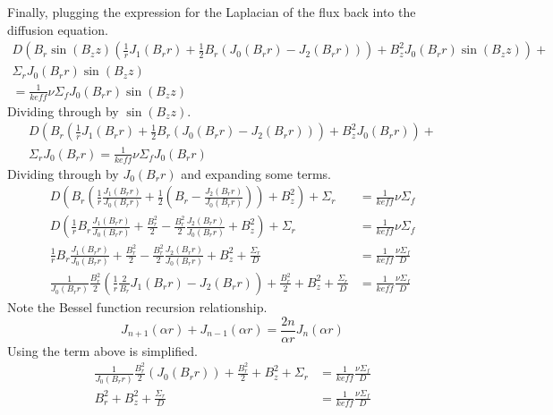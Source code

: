   Finally, plugging the expression for the Laplacian of the flux back into the
  diffusion equation.
  \begin{multline}
    D \left( B_r \sin(B_z z) \left( \frac{1}{r} J_1(B_r r) + \frac{1}{2} B_r
    \left( J_0(B_r r) - J_2(B_r r) \right) \right) + B_z^2 J_0(B_r r) \sin(B_z
    z) \right) + \\
    \Sigma_r J_0(B_r r) \sin(B_z z) \\
    = \frac{1}{keff} \nu
    \Sigma_f J_0(B_r r) \sin(B_z z)
  \end{multline}
  Dividing through by $\sin(B_z z)$.
  \begin{multline}
    D \left( B_r \left( \frac{1}{r} J_1(B_r r) + \frac{1}{2} B_r
    \left( J_0(B_r r) - J_2(B_r r) \right) \right) + B_z^2 J_0(B_r r) \right)+\\
    \Sigma_r J_0(B_r r) = \frac{1}{keff} \nu \Sigma_f J_0(B_r r) 
  \end{multline}
  Dividing through by $J_0(B_r r)$ and expanding some terms.
  \begin{align}
    D \left( B_r \left( \frac{1}{r} \frac{J_1(B_r r)}{J_0(B_r r)} + 
      \frac{1}{2} \left(B_r - \frac{J_2(B_r r)}{J_0(B_r r)} \right) \right) 
      + B_z^2 \right)+ \Sigma_r &= \frac{1}{keff} \nu \Sigma_f \\
    D \left( \frac{1}{r} B_r \frac{J_1(B_r r)}{J_0(B_r r)} + \frac{B_r^2}{2} -
      \frac{B_r^2}{2} \frac{J_2(B_r r)}{J_0(B_r r)} + B_z^2 \right) + \Sigma_r&=
      \frac{1}{keff} \nu \Sigma_f  \\
    \frac{1}{r} B_r \frac{J_1(B_r r)}{J_0(B_r r)} + \frac{B_r^2}{2} -
      \frac{B_r^2}{2} \frac{J_2(B_r r)}{J_0(B_r r)} + B_z^2 + 
      \frac{\Sigma_r}{D} &= \frac{1}{keff} \frac{\nu \Sigma_f}{D}\\
    \frac{1}{J_0(B_r r)} \frac{B_r^2}{2} \left(\frac{1}{r} \frac{2}{B_r} 
      J_1(B_r r) - J_2(B_r r) \right) + \frac{B_r^2}{2} + B_z^2 + 
      \frac{\Sigma_r}{D} &= \frac{1}{keff} \frac{\nu \Sigma_f}{D}
  \end{align}
  Note the Bessel function recursion relationship.
  \begin{equation} \label{eq:bessel_recursion}
    J_{n+1}(\alpha r) + J_{n-1}(\alpha r) = \frac{2n}{\alpha r} J_n(\alpha r)
  \end{equation}
  Using  the term above is simplified.
  \begin{align}
    \frac{1}{J_0(B_r r)} \frac{B_r^2}{2} \left( J_0(B_r r) \right) + 
      \frac{B_r^2}{2} + B_z^2 + \Sigma_r &= \frac{1}{keff} 
      \frac{\nu \Sigma_f}{D} \\
    B_r^2 + B_z^2 + \frac{\Sigma_r}{D} &= \frac{1}{keff} \frac{\nu \Sigma_f}
      {D}
  \end{align}
